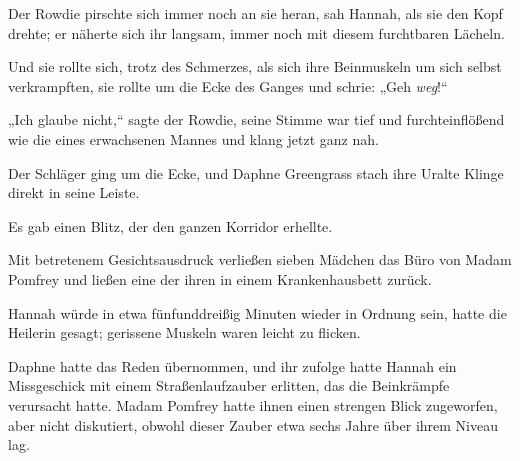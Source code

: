 Der Rowdie pirschte sich immer noch an sie heran, sah Hannah, als sie den Kopf drehte; er näherte sich ihr langsam, immer noch mit diesem furchtbaren Lächeln.

Und sie rollte sich, trotz des Schmerzes, als sich ihre Beinmuskeln um sich selbst verkrampften, sie rollte um die Ecke des Ganges und schrie: „Geh \emph{weg}!“

„Ich glaube nicht,“ sagte der Rowdie, seine Stimme war tief und furchteinflößend wie die eines erwachsenen Mannes und klang jetzt ganz nah.

Der Schläger ging um die Ecke, und Daphne Greengrass stach ihre Uralte Klinge direkt in seine Leiste.

Es gab einen Blitz, der den ganzen Korridor erhellte.

\later

Mit betretenem Gesichtsausdruck verließen sieben Mädchen das Büro von Madam Pomfrey und ließen eine der ihren in einem Krankenhausbett zurück.

Hannah würde in etwa fünfunddreißig Minuten wieder in Ordnung sein, hatte die Heilerin gesagt; gerissene Muskeln waren leicht zu flicken.

Daphne hatte das Reden übernommen, und ihr zufolge hatte Hannah ein Missgeschick mit einem Straßenlaufzauber erlitten, das die Beinkrämpfe verursacht hatte. Madam Pomfrey hatte ihnen einen strengen Blick zugeworfen, aber nicht diskutiert, obwohl dieser Zauber etwa sechs Jahre über ihrem Niveau lag.

